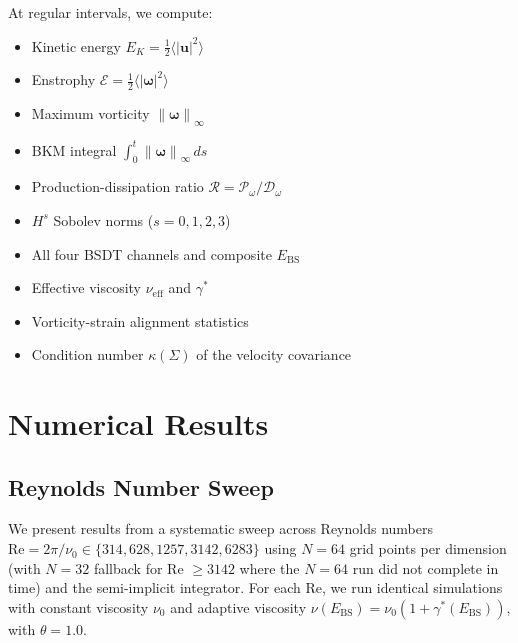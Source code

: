 \documentclass[12pt, a4paper]{article}
\newcommand{\norm}[1]{\left\| #1 \right\|}
\newcommand{\Ebs}{E_{\mathrm{BS}}}
\newcommand{\gammastar}{\gamma^*}
\begin{document}
At regular intervals, we compute:
\begin{itemize}
\item Kinetic energy $E_K = \frac{1}{2}\langle |\mathbf{u}|^2 \rangle$
\item Enstrophy $\mathcal{E} = \frac{1}{2}\langle |\boldsymbol{\omega}|^2 \rangle$
\item Maximum vorticity $\norm{\boldsymbol{\omega}}_\infty$
\item BKM integral $\int_0^t \norm{\boldsymbol{\omega}}_\infty \, ds$
\item Production-dissipation ratio $\mathcal{R} = \mathcal{P}_\omega / \mathcal{D}_\omega$
\item $H^s$ Sobolev norms ($s = 0, 1, 2, 3$)
\item All four BSDT channels and composite $\Ebs$
\item Effective viscosity $\nu_{\mathrm{eff}}$ and $\gammastar$
\item Vorticity-strain alignment statistics
\item Condition number $\kappa(\Sigma)$ of the velocity covariance
\end{itemize}


\section{Numerical Results}\label{sec:numerical_results}

\subsection{Reynolds Number Sweep}

We present results from a systematic sweep across Reynolds numbers
$\mathrm{Re} = 2\pi/\nu_0 \in \{314, 628, 1257, 3142, 6283\}$
using $N = 64$ grid points per dimension (with $N = 32$ fallback
for Re $\geq 3142$ where the $N = 64$ run did not complete in time)
and the semi-implicit integrator. For each Re, we run identical
simulations with constant viscosity $\nu_0$ and adaptive viscosity
$\nu(\Ebs) = \nu_0(1 + \gammastar(\Ebs))$, with $\theta = 1.0$.
\end{document}
